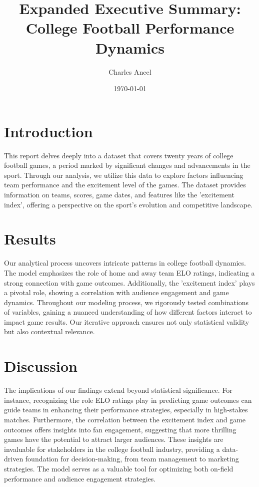 \documentclass{article}
\title{Expanded Executive Summary: College Football Performance Dynamics}
\author{Charles Ancel}
\date{\AdvanceDate[-1]\today}
\begin{document}
\maketitle

\section*{Introduction}
This report delves deeply into a dataset that covers twenty years of college football games, a period marked by significant changes and advancements in the sport. Through our analysis, we utilize this data to explore factors influencing team performance and the excitement level of the games. The dataset provides information on teams, scores, game dates, and features like the 'excitement index', offering a perspective on the sport's evolution and competitive landscape.

\section*{Results}
Our analytical process uncovers intricate patterns in college football dynamics. The model emphasizes the role of home and away team ELO ratings, indicating a strong connection with game outcomes. Additionally, the 'excitement index' plays a pivotal role, showing a correlation with audience engagement and game dynamics. Throughout our modeling process, we rigorously tested combinations of variables, gaining a nuanced understanding of how different factors interact to impact game results. Our iterative approach ensures not only statistical validity but also contextual relevance.

\section*{Discussion}
The implications of our findings extend beyond statistical significance. For instance, recognizing the role ELO ratings play in predicting game outcomes can guide teams in enhancing their performance strategies, especially in high-stakes matches. Furthermore, the correlation between the excitement index and game outcomes offers insights into fan engagement, suggesting that more thrilling games have the potential to attract larger audiences. These insights are invaluable for stakeholders in the college football industry, providing a data-driven foundation for decision-making, from team management to marketing strategies. The model serves as a valuable tool for optimizing both on-field performance and audience engagement strategies.
\end{document}
